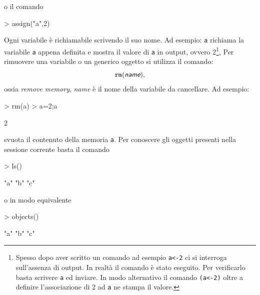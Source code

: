 \documentclass[onecolumn,11pt]{book}
\newcommand{\varia}[1]{\textsl{\textsf{#1}}}
\begin{document}
o il comando
\begin{Schunk}
\begin{Sinput}
> assign("a",2)
\end{Sinput}
\end{Schunk}
Ogni variabile \`e richiamabile scrivendo il suo nome.
Ad esempio:
\texttt{a} richiama la variabile \texttt{a} appena definita e mostra il valore di \texttt{a} in output, ovvero 2\footnote{Spesso 
dopo aver scritto un comando ad esempio \texttt{a<-2} ci si interroga sull'assenza di output. In realt\`a il comando \`e stato eseguito. Per verificarlo basta scrivere \texttt{a} ed inviare. In modo alternativo il comando  \texttt{(a<-2)} oltre a definire l'associazione di 2 ad \texttt{a} ne stampa il valore.},
Per rimuovere una variabile o un generico oggetto si utilizza il comando:
$$\texttt{rm}(\varia{name}),$$
 ossia {\it remove memory}, \varia{name} \`e il nome della variabile da cancellare. Ad  esempio: 
\begin{Schunk}
\begin{Sinput}
> rm(a)
> a=2;a
\end{Sinput}
\begin{Soutput}
[1] 2
\end{Soutput}
\end{Schunk}
svuota il contenuto della memoria \texttt{a}. Per conoscere gli oggetti presenti nella sessione corrente basta il comando
\begin{Schunk}
\begin{Sinput}
> ls()
\end{Sinput}
\begin{Soutput}
[1] "a" "b" "c"
\end{Soutput}
\end{Schunk}
o in modo equivalente
\begin{Schunk}
\begin{Sinput}
> objects()
\end{Sinput}
\begin{Soutput}
[1] "a" "b" "c"
\end{Soutput}
\end{Schunk}
\end{document}
